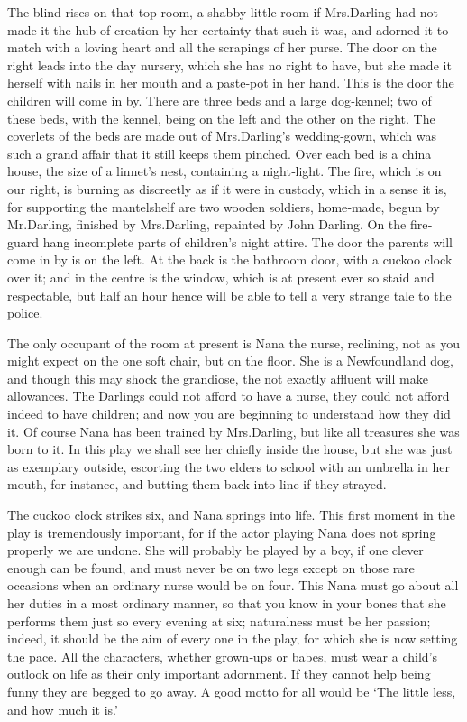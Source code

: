 \begin{Settings}
The blind
rises on that top room,
a shabby little room if Mrs.\@ Darling had not made it the hub of creation by her certainty that such it was,
and adorned it to match with a loving heart and all the scrapings of her purse.
The door on the right leads into the day nursery,
which she has no right to have, but she made it herself with nails in her mouth and a paste‐pot in her hand.
This is the door the children will come in by.
There are three beds and  a large dog‐kennel;
two of these beds, with the kennel, being on the left and the other on the right.
The coverlets of the beds  are made out of Mrs.\@ Darling’s wedding‐gown,
which was such a grand affair that it still keeps them pinched.
Over each bed is a china house, the size of a linnet’s nest, containing a night‐light.
The fire, which is on our right, is burning as discreetly as if it were in custody,
which in a sense it is, for supporting the mantelshelf are two wooden soldiers, home‐made,
begun by Mr.\@ Darling, finished by Mrs.\@ Darling, repainted  by John Darling.
On the fire‐guard hang incomplete parts of children’s night attire.
The door the parents will come in by is on the left.
At the back is the bathroom door, with a cuckoo clock over it;
and in the centre is the window, which is at present ever so staid and respectable,
but half an hour hence  will be able to tell a very strange tale to the police.

The only occupant of the room at present is Nana the nurse,
reclining, not as you might expect on the one soft chair, but on the floor.
She is a Newfoundland dog, and though this may shock the grandiose,
the not exactly affluent will make allowances.
The Darlings could not afford to have a nurse,
they could not afford indeed to have children;
and now you are beginning to understand how they did it.
Of course Nana has been trained by Mrs.\@ Darling,
but like all treasures she was born to it.
In this play we shall see her chiefly inside the house,
but she was just as exemplary outside,
escorting the two elders to school with an umbrella in her mouth, for instance,
and butting them back into line if they strayed.

The cuckoo clock strikes six, and Nana springs into life.
This first moment in the play is tremendously important,
for if the actor playing Nana does not spring properly we are undone.
She will probably be played by a boy, if one clever enough can be found,
and must never be on two legs except on those rare occasions when an ordinary nurse would be on four.
This Nana must go about all her duties in a most ordinary manner,
so that you know in your bones that she performs them just so every evening at six;
naturalness must be her passion;
indeed, it should be the aim of every one in the play, for which she is now setting the pace.
All the characters, whether grown‐ups or babes,
must wear a child’s outlook on life as their only important adornment.
If they cannot help being funny they are begged to go away.
A good motto for all would be ‘The little less, and how much it is.’


\end{Settings}
